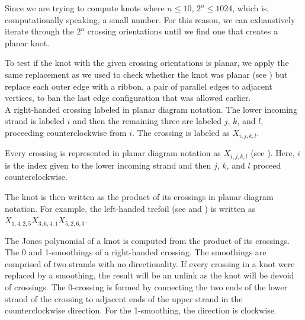 \begin{paper}
Since we are trying to compute knots where $n\leq10$, $2^n\leq1024$, which is,
computationally speaking, a small number.
For this reason, we can exhaustively iterate through the $2^n$ crossing
orientations until we find one that creates a planar knot.

To test if the knot with the given crossing orientations is planar, we apply the
same replacement as we used to check whether the knot was planar (see \figGraph)
but replace each outer edge with a ribbon, a pair of parallel edges to adjacent
vertices, to ban the last edge configuration that was allowed earlier.\\

{A right-handed crossing labeled in planar diagram notation.
The lower incoming strand is labeled $i$ and then the remaining three are
labeled $j$, $k$, and $l$, proceeding counterclockwise from $i$.
The crossing is labeled as $X_{i,j,k,l}$.}

Every crossing is represented in planar diagram notation as $X_{i,j,k,l}$ (see
\figX).
Here, $i$ is the index given to the lower incoming strand and then $j$, $k$, and
$l$ proceed counterclockwise.

The knot is then written as the product of its crossings in planar diagram
notation.
For example, the left-handed trefoil (see \figTrefoil and \figLabeled) is
written as $X_{1,4,2,5}X_{3,6,4,1}X_{5,2,6,3}$.



The Jones polynomial of a knot is computed from the product of its crossings.\\

{The 0 and 1-smoothings of a right-handed crossing.
The smoothings are comprised of two strands with no directionality.
If every crossing in a knot were replaced by a smoothing, the result will be an
unlink as the knot will be devoid of crossings.
The 0-crossing is formed by connecting the two ends of the lower strand of the
crossing to adjacent ends of the upper strand in the counterclockwise direction.
For the 1-smoothing, the direction is clockwise.}


\end{paper}
